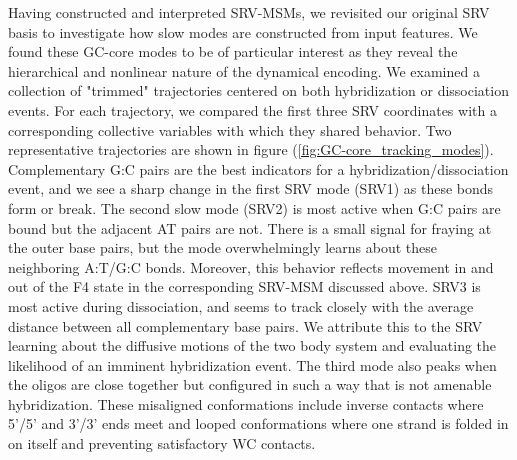 \documentclass[journal=jpcbfk,manuscript=article]{achemso}
\begin{document}

Having constructed and interpreted SRV-MSMs, we revisited our original SRV basis to investigate how slow modes are constructed from input features. We found these GC-core modes to be of particular interest as they reveal the hierarchical and nonlinear nature of the dynamical encoding. We examined a collection of "trimmed" trajectories centered on both hybridization or dissociation events. For each trajectory, we compared the first three SRV coordinates with a corresponding collective variables with which they shared behavior. Two representative trajectories are shown in figure (\ref{fig:GC-core_tracking_modes}). Complementary G:C pairs are the best indicators for a hybridization/dissociation event, and we see a sharp change in the first SRV mode (SRV1) as these bonds form or break. The second slow mode (SRV2) is most active when G:C pairs are bound but the adjacent AT pairs are not. There is a small signal for fraying at the outer base pairs, but the mode overwhelmingly learns about these neighboring A:T/G:C bonds. Moreover, this behavior reflects movement in and out of the F4 state in the corresponding SRV-MSM discussed above. SRV3 is most active during dissociation, and seems to track closely with the average distance between all complementary base pairs. We attribute this to the SRV learning about the diffusive motions of the two body system and evaluating the likelihood of an imminent hybridization event. The third mode also peaks when the oligos are close together but configured in such a way that is not amenable hybridization. These misaligned conformations include inverse contacts where 5'/5' and 3'/3' ends meet and looped conformations where one strand is folded in on itself and preventing satisfactory WC contacts. 
\end{document}
